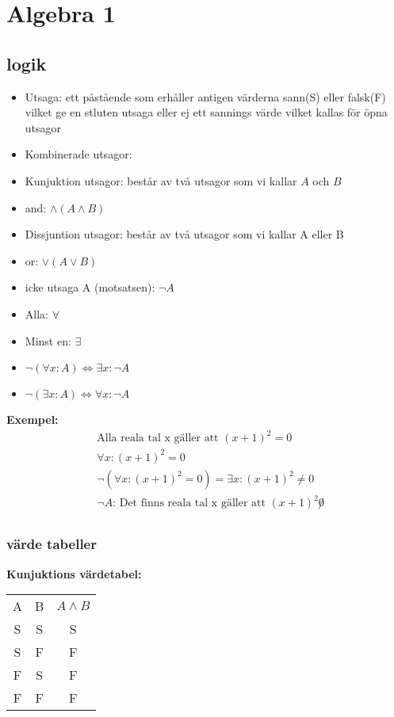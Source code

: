 \chapter{Algebra 1}

\newpage

\begin{multicols}{2}
\section{logik}
\begin{itemize}
\item Utsaga: ett påstående som erhåller antigen värderna sann(S) eller falsk(F) vilket ge en stluten utsaga
eller ej ett sannings värde vilket kallas för öpna utsagor
\item Kombinerade utsagor:
\item Kunjuktion utsagor: består av två utsagor som vi kallar $A$ och $B$
\item and: $\land  (A \land B)$
\item Dissjuntion utsagor: består av två utsagor som vi kallar A eller B
\item or: $\lor  (A \lor B)$
\item icke utsaga A (motsatsen): $\neg A$
\item Alla: $\forall$
\item Minst en:  $\exists$
\item $\neg(\forall x : A) \Leftrightarrow \exists x : \neg A$
\item $\neg(\exists x : A) \Leftrightarrow \forall x : \neg A$
\end{itemize}

\textbf{Exempel:}
\begin{align*}
  &\text{Alla reala tal x gäller att } (x+1)^2 = 0 \\
  &\forall x : (x+1)^2 = 0 \\
  &\neg(\forall x : (x+1)^2 = 0) = \exists x : (x+1)^2 \not = 0 \\
  &\neg A \text{: Det finns reala tal x gäller att } (x+1)^2 \not 0 \\
\end{align*}


\subsection{värde tabeller}
\textbf{Kunjuktions värdetabel:}\par
\begin{center}
\begin{tabular}{ |c|c|c| } 
 \hline
 A  & B  & \(A \land B\) \\ 
 S  & S  & S          \\ 
 S  & F  & F          \\  
 F  & S  & F          \\ 
 F  & F  & F          \\ 
 \hline
\end{tabular}
\end{center}


\end{multicols}
